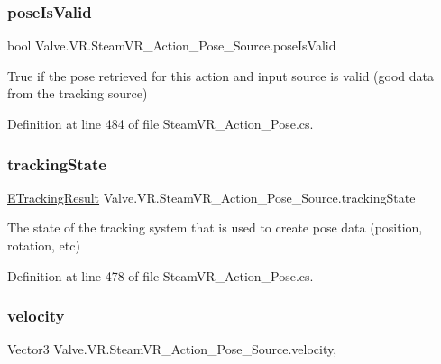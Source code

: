 \subsubsection{\texorpdfstring{poseIsValid}{poseIsValid}}
{\footnotesize\ttfamily bool Valve.\+V\+R.\+Steam\+V\+R\+\_\+\+Action\+\_\+\+Pose\+\_\+\+Source.\+pose\+Is\+Valid\hspace{0.3cm}{\ttfamily [get]}}



True if the pose retrieved for this action and input source is valid (good data from the tracking source) 



Definition at line 484 of file Steam\+V\+R\+\_\+\+Action\+\_\+\+Pose.\+cs.

\mbox{\label{class_valve_1_1_v_r_1_1_steam_v_r___action___pose___source_ac34e76b909d5bae5549ef1254aee7334}} 
\subsubsection{\texorpdfstring{trackingState}{trackingState}}
{\footnotesize\ttfamily \mbox{\hyperlink{namespace_valve_1_1_v_r_abe6feab98f33191b7c27b4292012e90a}{E\+Tracking\+Result}} Valve.\+V\+R.\+Steam\+V\+R\+\_\+\+Action\+\_\+\+Pose\+\_\+\+Source.\+tracking\+State\hspace{0.3cm}{\ttfamily [get]}}



The state of the tracking system that is used to create pose data (position, rotation, etc) 



Definition at line 478 of file Steam\+V\+R\+\_\+\+Action\+\_\+\+Pose.\+cs.

\mbox{\label{class_valve_1_1_v_r_1_1_steam_v_r___action___pose___source_a52549ae6b1ddc04aa27f439314440c5a}} 
\subsubsection{\texorpdfstring{velocity}{velocity}}
{\footnotesize\ttfamily Vector3 Valve.\+V\+R.\+Steam\+V\+R\+\_\+\+Action\+\_\+\+Pose\+\_\+\+Source.\+velocity\hspace{0.3cm}{\ttfamily [get]}, {}}




